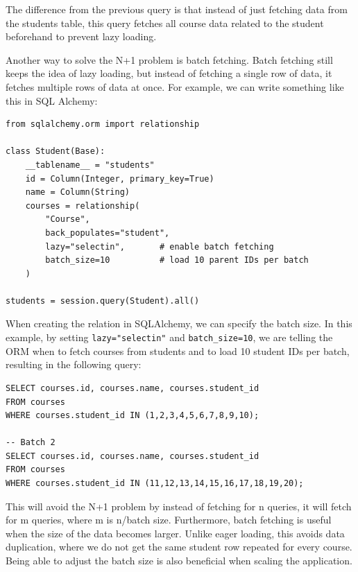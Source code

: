 The difference from the previous query is that instead of just fetching data from the students table,
this query fetches all course data related to the student beforehand to prevent lazy loading.

Another way to solve the N+1 problem is batch fetching. Batch fetching still keeps the idea of lazy loading,
but instead of fetching a single row of data, it fetches multiple rows of data at once. For example, 
we can write something like this in SQL Alchemy:

\begin{verbatim}
from sqlalchemy.orm import relationship

class Student(Base):
    __tablename__ = "students"
    id = Column(Integer, primary_key=True)
    name = Column(String)
    courses = relationship(
        "Course",
        back_populates="student",
        lazy="selectin",       # enable batch fetching
        batch_size=10          # load 10 parent IDs per batch
    )

students = session.query(Student).all()
\end{verbatim}

When creating the relation in SQLAlchemy, we can specify the batch size. 
In this example, by setting \texttt{lazy="selectin"} and \texttt{batch\_size=10}, 
we are telling the ORM when to fetch courses from students and to load 
10 student IDs per batch, resulting in the following query:

\begin{verbatim}
SELECT courses.id, courses.name, courses.student_id
FROM courses
WHERE courses.student_id IN (1,2,3,4,5,6,7,8,9,10);

-- Batch 2
SELECT courses.id, courses.name, courses.student_id
FROM courses
WHERE courses.student_id IN (11,12,13,14,15,16,17,18,19,20);
\end{verbatim}

This will avoid the N+1 problem by instead of fetching for n queries, it will fetch for m queries, where m is n/batch size.
Furthermore, batch fetching is useful when the size of the data becomes larger. Unlike eager loading, this avoids data duplication,
where we do not get the same student row repeated for every course.
Being able to adjust the batch size is also beneficial when scaling the application.
